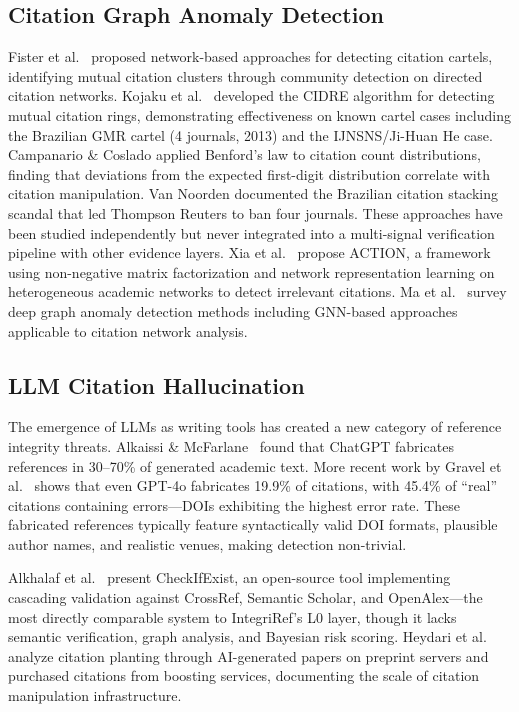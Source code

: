 \documentclass[sigconf,nonacm]{acmart}
\begin{document}
\subsection{Citation Graph Anomaly Detection}

Fister et al.\ \cite{fister2016toward} proposed network-based approaches for detecting citation cartels, identifying mutual citation clusters through community detection on directed citation networks.
Kojaku et al.\ \cite{kojaku2021} developed the CIDRE algorithm for detecting mutual citation rings, demonstrating effectiveness on known cartel cases including the Brazilian GMR cartel (4 journals, 2013) and the IJNSNS/Ji-Huan He case.
Campanario \& Coslado \cite{campanario2011benford} applied Benford's law to citation count distributions, finding that deviations from the expected first-digit distribution correlate with citation manipulation.
Van Noorden \cite{vannoorden2013} documented the Brazilian citation stacking scandal that led Thompson Reuters to ban four journals.
These approaches have been studied independently but never integrated into a multi-signal verification pipeline with other evidence layers.
Xia et al.~\cite{xia2023action} propose ACTION, a framework using non-negative matrix factorization and network representation learning on heterogeneous academic networks to detect irrelevant citations.
Ma et al.~\cite{ma2025graphad} survey deep graph anomaly detection methods including GNN-based approaches applicable to citation network analysis.

\subsection{LLM Citation Hallucination}

The emergence of LLMs as writing tools has created a new category of reference integrity threats.
Alkaissi \& McFarlane~\cite{alkaissi2023} found that ChatGPT fabricates references in 30--70\% of generated academic text.
More recent work by Gravel et al.~\cite{gravel2024} shows that even GPT-4o fabricates 19.9\% of citations, with 45.4\% of ``real'' citations containing errors---DOIs exhibiting the highest error rate.
These fabricated references typically feature syntactically valid DOI formats, plausible author names, and realistic venues, making detection non-trivial.

Alkhalaf et al.~\cite{alkhalaf2025} present CheckIfExist, an open-source tool implementing cascading validation against CrossRef, Semantic Scholar, and OpenAlex---the most directly comparable system to IntegriRef's L0 layer, though it lacks semantic verification, graph analysis, and Bayesian risk scoring.
Heydari et al.~\cite{heydari2025} analyze citation planting through AI-generated papers on preprint servers and purchased citations from boosting services, documenting the scale of citation manipulation infrastructure.
\end{document}
